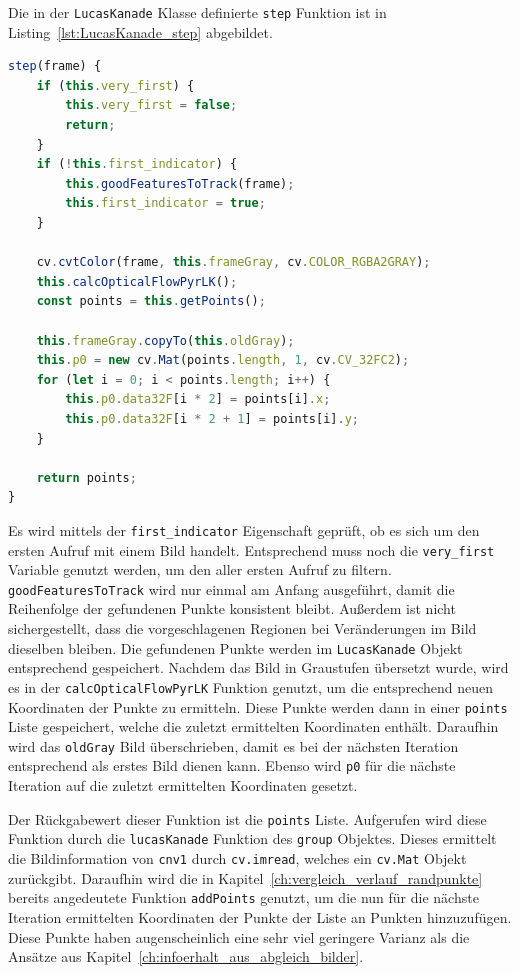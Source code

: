 Die in der \lstinline{LucasKanade} Klasse definierte \lstinline{step} Funktion ist in Listing~\ref{lst:LucasKanade_step} abgebildet.

\begin{lstlisting}[language=JavaScript, caption={Implementation der \lstinline{step} Funktion der \lstinline{LucasKanade} Klasse}, label={lst:LucasKanade_step}]
step(frame) {
    if (this.very_first) {
        this.very_first = false;
        return;
    }
    if (!this.first_indicator) {
        this.goodFeaturesToTrack(frame);
        this.first_indicator = true;
    }

    cv.cvtColor(frame, this.frameGray, cv.COLOR_RGBA2GRAY);
    this.calcOpticalFlowPyrLK();
    const points = this.getPoints();

    this.frameGray.copyTo(this.oldGray);
    this.p0 = new cv.Mat(points.length, 1, cv.CV_32FC2);
    for (let i = 0; i < points.length; i++) {
        this.p0.data32F[i * 2] = points[i].x;
        this.p0.data32F[i * 2 + 1] = points[i].y;
    }

    return points;
}
\end{lstlisting}

Es wird mittels der \lstinline{first_indicator} Eigenschaft geprüft, ob es sich um den ersten Aufruf mit einem Bild handelt.
Entsprechend muss noch die \lstinline{very_first} Variable genutzt werden, um den aller ersten Aufruf zu filtern.
\lstinline{goodFeaturesToTrack} wird nur einmal am Anfang ausgeführt, damit die Reihenfolge der gefundenen Punkte konsistent bleibt.
Au{\ss}erdem ist nicht sichergestellt, dass die vorgeschlagenen Regionen bei Veränderungen im Bild dieselben bleiben.
Die gefundenen Punkte werden im \lstinline{LucasKanade} Objekt entsprechend gespeichert.
Nachdem das Bild in Graustufen übersetzt wurde, wird es in der \lstinline{calcOpticalFlowPyrLK} Funktion genutzt, um die entsprechend neuen Koordinaten der Punkte zu ermitteln.
Diese Punkte werden dann in einer \lstinline{points} Liste gespeichert, welche die zuletzt ermittelten Koordinaten enthält.
Daraufhin wird das \lstinline{oldGray} Bild überschrieben, damit es bei der nächsten Iteration entsprechend als erstes Bild dienen kann.
Ebenso wird \lstinline{p0} für die nächste Iteration auf die zuletzt ermittelten Koordinaten gesetzt.

Der Rückgabewert dieser Funktion ist die \lstinline{points} Liste.
Aufgerufen wird diese Funktion durch die \lstinline{lucasKanade} Funktion des \lstinline{group} Objektes.
Dieses ermittelt die Bildinformation von \lstinline{cnv1} durch \lstinline{cv.imread}, welches ein \lstinline{cv.Mat} Objekt zurückgibt.
Daraufhin wird die in Kapitel~\ref{ch:vergleich_verlauf_randpunkte} bereits angedeutete Funktion \lstinline{addPoints} genutzt, um die nun für die nächste Iteration ermittelten Koordinaten der Punkte der Liste an Punkten hinzuzufügen.
Diese Punkte haben augenscheinlich eine sehr viel geringere Varianz als die Ansätze aus Kapitel~\ref{ch:infoerhalt_aus_abgleich_bilder}.

